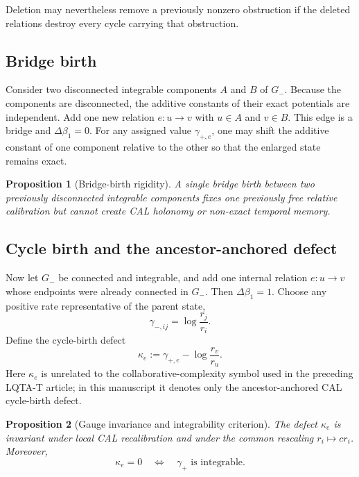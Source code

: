 \documentclass[aip,jmp,amsmath,amssymb,reprint]{revtex4-2}
\newtheorem{proposition}{Proposition}
\begin{document}
Deletion may nevertheless remove a previously nonzero obstruction if the deleted relations destroy every cycle carrying that obstruction.

\subsection{Bridge birth}

Consider two disconnected integrable components $A$ and $B$ of $G_-$. Because the components are disconnected, the additive constants of their exact potentials are independent. Add one new relation $e:u\to v$ with $u\in A$ and $v\in B$. This edge is a bridge and $\Delta\beta_1=0$. For any assigned value $\gamma_{+,e}$, one may shift the additive constant of one component relative to the other so that the enlarged state remains exact.

\begin{proposition}[Bridge-birth rigidity]\label{prop:bridge-birth}
A single bridge birth between two previously disconnected integrable components fixes one previously free relative calibration but cannot create CAL holonomy or non-exact temporal memory.
\end{proposition}

\subsection{Cycle birth and the ancestor-anchored defect}

Now let $G_-$ be connected and integrable, and add one internal relation $e:u\to v$ whose endpoints were already connected in $G_-$. Then $\Delta\beta_1=1$. Choose any positive rate representative of the parent state,
\begin{equation}
\gamma_{-,ij}=\log\frac{r_j}{r_i}.
\end{equation}
Define the cycle-birth defect
\begin{equation}
\boxed{
\kappa_e
:=
\gamma_{+,e}-\log\frac{r_v}{r_u}
}.
\label{eq:kappa-single}
\end{equation}
Here $\kappa_e$ is unrelated to the collaborative-complexity symbol used in the preceding LQTA-T article; in this manuscript it denotes only the ancestor-anchored CAL cycle-birth defect.

\begin{proposition}[Gauge invariance and integrability criterion]\label{prop:kappa-gauge}
The defect $\kappa_e$ is invariant under local CAL recalibration and under the common rescaling $r_i\mapsto c r_i$. Moreover,
\begin{equation}
\kappa_e=0
\quad\Longleftrightarrow\quad
\gamma_+\text{ is integrable}.
\label{eq:kappa-integrability}
\end{equation}
\end{proposition}
\end{document}
